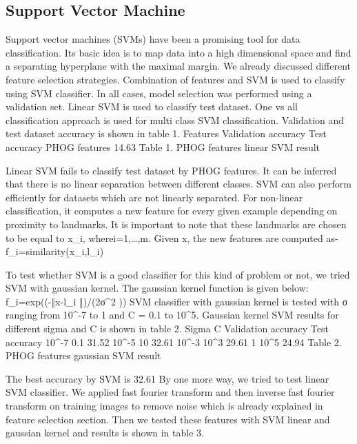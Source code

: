 \documentclass[10pt,twocolumn]{article}
\begin{document}
\subsection{Support Vector Machine}
Support vector machines (SVMs) have been a promising tool for data classification. Its basic idea is to map data into a high dimensional space and find a separating hyperplane with the maximal margin.
We already discussed different feature selection strategies. \cite {chen2006combining} Combination of features and SVM is used to classify using SVM classifier. In all cases, model selection was performed using a validation set. Linear SVM is used to classify test dataset. One vs all classification approach is used for multi class SVM classification. Validation and test dataset accuracy is shown in table 1.
Features	Validation accuracy	Test accuracy
PHOG features	14.63%
Table 1. PHOG features linear SVM result

Linear SVM fails to classify test dataset by PHOG features. It can be inferred that there is no linear separation between different classes.
SVM can also perform efficiently for datasets which are not linearly separated. For non-linear classification, it computes a new feature for every given example depending on proximity to landmarks. It is important to note that these landmarks are chosen to be equal to x_i, wherei=1,…,m. Given x, the new features are computed as-
f_i=similarity(x_i,l_i)
 
To test whether SVM is a good classifier for this kind of problem or not, we tried SVM with gaussian kernel. The gaussian kernel function is given below:
f_i=exp⁡((-‖x-l_i ‖)/(2σ^2 ))
\cite {larochelle2007empirical} SVM classifier with gaussian kernel is tested with σ ranging from 10^-7 to 1 and C = 0.1 to 10^5. Gaussian kernel SVM results for different sigma and C is shown in table 2.
Sigma	C	Validation accuracy	Test accuracy
10^-7	0.1	31.52%
10^-5	10	32.61%
10^-3	10^3	29.61%
1	10^5	24.94%
Table 2. PHOG features gaussian SVM result

The best accuracy by SVM is 32.61%
By one more way, we tried to test linear SVM classifier. We applied fast fourier transform and then inverse fast fourier transform on training images to remove noise which is already explained in feature selection section. Then we tested these features with SVM linear and gaussian kernel and results is shown in table 3.
\end{document}

